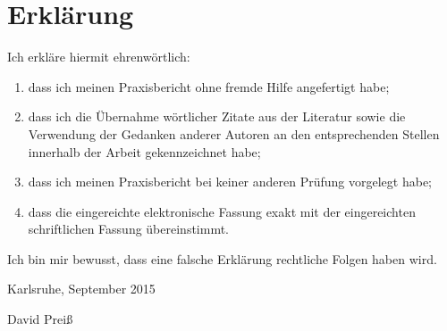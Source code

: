 \chapter*{Erklärung}
Ich erkläre hiermit ehrenwörtlich: \\
\begin{enumerate}
\item dass ich meinen Praxisbericht ohne fremde Hilfe angefertigt habe;
\item dass ich die Übernahme wörtlicher Zitate aus der Literatur sowie die Verwendung der Gedanken
anderer Autoren an den entsprechenden Stellen innerhalb der Arbeit gekennzeichnet habe;
\item dass ich meinen Praxisbericht bei keiner anderen Prüfung vorgelegt habe;
\item dass die eingereichte elektronische Fassung exakt mit der eingereichten schriftlichen Fassung
übereinstimmt.
\end{enumerate}

Ich bin mir bewusst, dass eine falsche Erklärung rechtliche Folgen haben wird.
\vspace{3em}

Karlsruhe, September 2015
\vspace{4em}

David Preiß